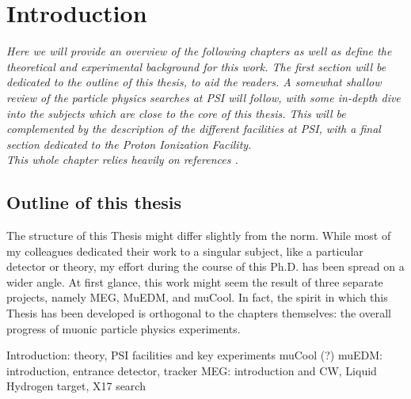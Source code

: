\chapter{Introduction}

\begin{refsection}

{\itshape
Here we will provide an overview of the following chapters as well as define the theoretical and experimental background for this work. 
The first section will be dedicated to the outline of this thesis, to aid the readers. 
A somewhat shallow review of the particle physics searches at PSI will follow, with some in-depth dive into the subjects which are close to the core of this thesis. 
This will be complemented by the description of the different facilities at PSI, with a final section dedicated to the Proton Ionization Facility.\\ 
This whole chapter relies heavily on references \textcite{Signorelli} \cite{PSI:review:2021}.}

\section{Outline of this thesis}
    The structure of this Thesis might differ slightly from the norm. 
    While most of my colleagues dedicated their work to a singular subject, like a particular detector or theory, my effort during the course of this Ph.D. has been spread on a wider angle.
    At first glance, this work might seem the result of three separate projects, namely MEG, MuEDM, and muCool. 
    In fact, the spirit in which this Thesis has been developed is orthogonal to the chapters themselves: the overall progress of muonic particle physics experiments.

    \begin{outline}
        \1 Introduction: theory, PSI facilities and key experiments
        \1 muCool (?)
        \1 muEDM: introduction, entrance detector, tracker
        \1 MEG: introduction and CW, Liquid Hydrogen target, X17 search
    \end{outline}


\end{refsection}

